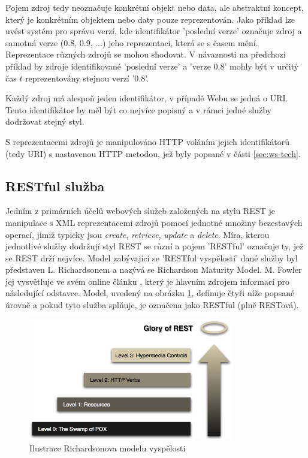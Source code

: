 \documentclass[czech,DP]{thesiskiv}
\begin{document}
Pojem zdroj tedy neoznačuje konkrétní objekt nebo data, ale abstraktní koncept, který je konkrétním objektem nebo daty pouze reprezentován. Jako příklad lze uvést systém pro správu verzí, kde identifikátor 'poslední verze' označuje zdroj a samotná verze (0.8, 0.9, ...) jeho reprezentaci, která se s časem mění. Reprezentace různých zdrojů se mohou shodovat. V návaznosti na předchozí příklad by zdroje identifikované 'poslední verze' a 'verze 0.8' mohly být v určitý čas $t$ reprezentovány stejnou verzí '0.8'. 

Každý zdroj má alespoň jeden identifikátor, v případě Webu se jedná o URI. Tento identifikátor by měl být co nejvíce popisný a v rámci jedné služby dodržovat stejný styl\cite{restfulWebServices}. 

S reprezentacemi zdrojů je manipulováno HTTP voláním jejich identifikátorů (tedy URI) s nastavenou HTTP metodou, jež byly popsané v části \ref{sec:ws-tech}.

\subsection{RESTful služba}
\label{sec:restful}

Jedním z primárních účelů webových služeb založených na stylu REST je manipulace s XML reprezentacemi zdrojů pomocí jednotné množiny bezestavých operací, jimiž typicky jsou  \textit{create}, \textit{retrieve}, \textit{update} a \textit{delete}\cite{w3cWsArch}. Míra, kterou jednotlivé služby dodržují styl REST se různí a pojem 'RESTful' označuje ty, jež se REST drží nejvíce. Model zabývající se 'RESTful vyspělostí' dané služby byl představen L. Richardsonem a nazývá se Richardson Maturity Model. M. Fowler jej vysvětluje ve svém online článku \cite{restfulMaturity}, který je hlavním zdrojem informací pro následující odstavce. Model, uvedený na obrázku \ref{fig:rmm}, definuje čtyři níže popsané úrovně a pokud tyto služba splňuje, je označena jako RESTful (plně RESTová).

\begin{figure}[h]
	\centering
	\includegraphics[width=9cm]{richardsonMaturityModel}
	\caption{Ilustrace Richardsonova modelu vyspělosti}
	\label{fig:rmm}
\end{figure}
\end{document}
